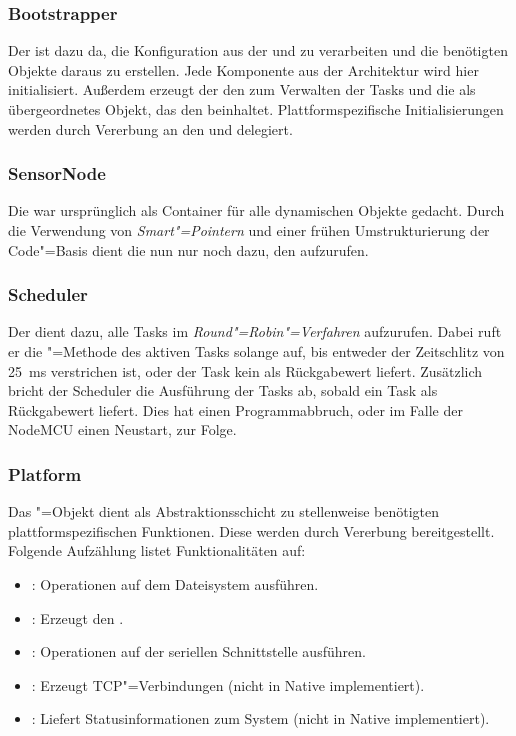 \subsubsection{Bootstrapper}
Der  ist dazu da, die Konfiguration aus der  und  zu verarbeiten und die benötigten Objekte daraus zu erstellen.
Jede Komponente aus der Architektur wird hier initialisiert.
Außerdem erzeugt der  den  zum Verwalten der Tasks und die  als übergeordnetes Objekt, das den  beinhaltet.
Plattformspezifische Initialisierungen werden durch Vererbung an den  und  delegiert.

\subsubsection{SensorNode}
Die  war ursprünglich als Container für alle dynamischen Objekte gedacht.
Durch die Verwendung von \textit{Smart"=Pointern} und einer frühen Umstrukturierung der Code"=Basis dient die  nun nur noch dazu, den  aufzurufen.

\subsubsection{Scheduler}
Der  dient dazu, alle Tasks im \textit{Round"=Robin"=Verfahren} aufzurufen.
Dabei ruft er die "=Methode des aktiven Tasks solange auf, bis entweder der Zeitschlitz von \SI{25}{ms} verstrichen ist, oder der Task kein   als Rückgabewert liefert.
Zusätzlich bricht der Scheduler die Ausführung der Tasks ab, sobald ein Task  als Rückgabewert liefert.
Dies hat einen Programmabbruch, oder im Falle der NodeMCU einen Neustart, zur Folge.

\subsubsection{Platform}
Das "=Objekt dient als Abstraktionsschicht zu stellenweise benötigten plattformspezifischen Funktionen.
Diese werden durch Vererbung bereitgestellt.
Folgende Aufzählung listet Funktionalitäten auf:
\begin{itemize}
	\item {}: Operationen auf dem Dateisystem ausführen.
	\item {}: Erzeugt den .
	\item {}: Operationen auf der seriellen Schnittstelle ausführen.
	\item {}: Erzeugt TCP"=Verbindungen (nicht in Native implementiert).
	\item {}: Liefert Statusinformationen zum System (nicht in Native implementiert).
\end{itemize}

